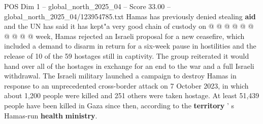 \begin{textsample}{POS Dim 1 – global\_north\_2025\_04 – Score 33.00 – global\_north\_2025\_04/123954785.txt}
Hamas has previously denied stealing \textbf{aid} and the UN has said it has kept"a very good chain of custody on @ @ @ @ @ @ @ @ @ @ week, Hamas rejected an Israeli proposal for a new ceasefire, which included a demand to disarm in return for a six-week pause in hostilities and the release of 10 of the 59 hostages still in captivity.
The group reiterated it would hand over all of the hostages in exchange for an end to the war and a full Israeli withdrawal.
The Israeli military launched a campaign to destroy Hamas in response to an unprecedented cross-border attack on 7 October 2023, in which about 1,200 people were killed and 251 others were taken hostage.
At least 51,439 people have been killed in Gaza since then, according to the \textbf{territory} ' s Hamas-run \textbf{health} \textbf{ministry}.

\end{textsample}
